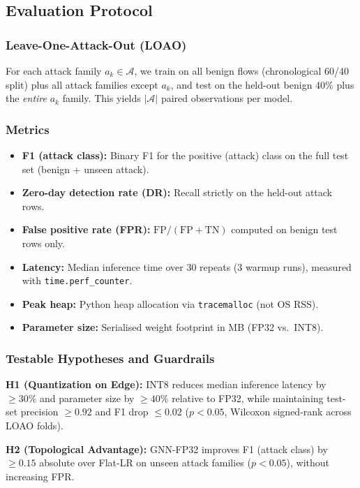 \documentclass[conference]{IEEEtran}
\begin{document}
\subsection{Evaluation Protocol}\label{subsec:protocol}

\subsubsection{Leave-One-Attack-Out (LOAO)}
For each attack family $a_k \in \mathcal{A}$, we train on all benign flows
(chronological 60/40 split) plus all attack families except $a_k$, and test
on the held-out benign 40\% plus the \emph{entire} $a_k$ family.  This
yields $|\mathcal{A}|$ paired observations per model.

\subsubsection{Metrics}
\begin{itemize}
  \item \textbf{F1 (attack class):} Binary F1 for the positive (attack) class
        on the full test set (benign $+$ unseen attack).
  \item \textbf{Zero-day detection rate (DR):} Recall strictly on the held-out
        attack rows.
  \item \textbf{False positive rate (FPR):} $\mathrm{FP}/(\mathrm{FP}+\mathrm{TN})$
        computed on benign test rows only.
  \item \textbf{Latency:} Median inference time over 30 repeats (3 warmup
        runs), measured with \texttt{time.perf\_counter}.
  \item \textbf{Peak heap:} Python heap allocation via \texttt{tracemalloc}
        (not OS RSS).
  \item \textbf{Parameter size:} Serialised weight footprint in MB (FP32
        vs.\ INT8).
\end{itemize}

\subsubsection{Testable Hypotheses and Guardrails}
\noindent\textbf{H1 (Quantization on Edge):}  INT8 reduces median inference
latency by ${\ge}30\%$ and parameter size by ${\ge}40\%$ relative to FP32,
while maintaining test-set precision ${\ge}0.92$ and F1 drop ${\le}0.02$
($p < 0.05$, Wilcoxon signed-rank across LOAO folds).

\noindent\textbf{H2 (Topological Advantage):}  GNN-FP32 improves F1 (attack
class) by ${\ge}0.15$ absolute over Flat-LR on unseen attack families
($p < 0.05$), without increasing FPR.
\end{document}
